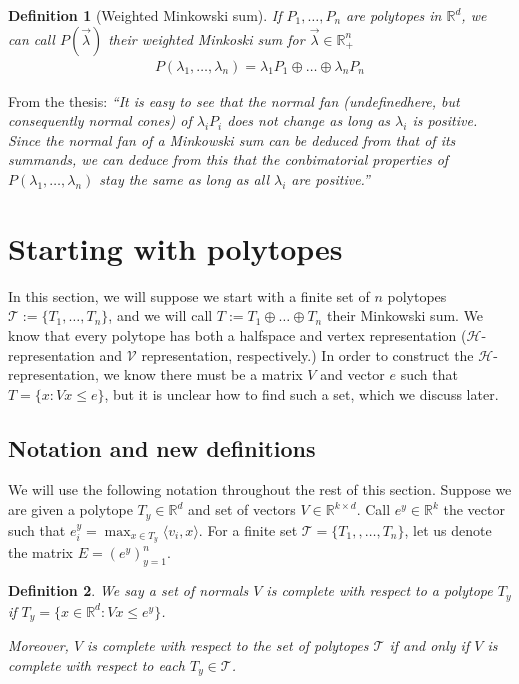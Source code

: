 \documentclass[12pt]{article}
\newcommand{\reals}{\mathbb{R}}
\renewcommand{\H}{\mathcal{H}}
\newcommand{\T}{\mathcal{T}}
\newcommand{\V}{\mathcal{V}}
\newcommand{\inprod}[2]{\langle #1, #2 \rangle}%
\newtheorem{definition}{Definition}
\begin{document}
\begin{definition}[Weighted Minkowski sum]
  If $P_1, \ldots, P_n$ are polytopes in $\reals^d$, we can call $P(\vec \lambda)$ their \emph{weighted} Minkoski sum for $\vec \lambda \in \reals^n_+$
  \begin{align*}
    P(\lambda_1, \ldots, \lambda_n) = \lambda_1 P_1 \oplus \ldots \oplus \lambda_n P_n
  \end{align*}
\end{definition}

  From the thesis:  \emph{``It is easy to see that the normal fan (undefinedhere, but consequently normal cones) of $\lambda_i P_i$ does not change as long as $\lambda_i$ is positive.  Since the normal fan of a Minkowski sum can be deduced from that of its summands, we can deduce from this that the conbimatorial properties of $P(\lambda_1, \ldots, \lambda_n)$ stay the same as long as all $\lambda_i$ are positive.''}

  \section{Starting with polytopes}\label{sec:start-polytope}
  In this section, we will suppose we start with a finite set of $n$ polytopes $\T := \{T_1, \ldots, T_n\}$, and we will call $T := T_1 \oplus \ldots \oplus T_n$ their Minkowski sum.
  We know that every polytope has both a halfspace and vertex representation ($\H$-representation and $\V$ representation, respectively.)
  In order to construct the $\H$-representation, we know there must be a matrix $V$ and vector $e$ such that $T = \{x : Vx \leq e\}$, but it is unclear how to find such a set, which we discuss later.

  \subsection{Notation and new definitions}
  We will use the following notation throughout the rest of this section.
  Suppose we are given a polytope $T_y \in \reals^d$ and set of vectors $V \in \reals^{k \times d}$.
  Call $e^y \in \reals^k$ the vector such that $e^y_i = \max_{x \in T_y}\inprod{v_i}{x}$.  
  For a finite set $\T = \{T_1, , \ldots, T_n\}$, let us denote the matrix $E = (e^y)_{y=1}^n$.
  \begin{definition}
    We say a set of normals $V$ is \emph{complete} with respect to a polytope $T_y$ if $T_y = \{x \in \reals^d: Vx \leq e^y\}$.

    Moreover, $V$ is complete with respect to the set of polytopes $\T$ if and only if $V$ is complete with respect to each $T_y \in \T$.
  \end{definition}
\end{document}
